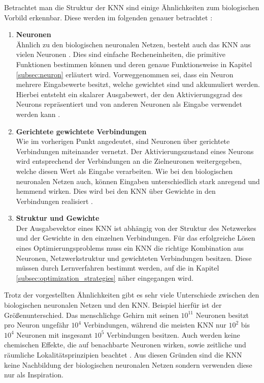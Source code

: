 Betrachtet man die Struktur der \ac{KNN} sind einige Ähnlichkeiten zum biologischen Vorbild erkennbar. Diese werden im folgenden genauer betrachtet \cite{zell2003simulation}:
\begin{enumerate}
	\item \textbf{Neuronen}\\
	Ähnlich zu den biologischen neuronalen Netzen, besteht auch das \ac{KNN} aus vielen Neuronen \cite{zell2003simulation}. Dies sind einfache Recheneinheiten, die primitive Funktionen bestimmen können \cite{scherer2013neuronale} und deren genaue Funktionsweise in Kapitel \ref{subsec:neuron} erläutert wird. Vorweggenommen sei, dass ein Neuron mehrere Eingabewerte besitzt, welche gewichtet sind und akkumuliert werden. Hierbei entsteht ein skalarer Ausgabewert, der den Aktivierungsgrad des Neurons repräsentiert und von anderen Neuronen als Eingabe verwendet werden kann \cite{kriesel2008kleiner}. 
	 
	\item \textbf{Gerichtete gewichtete Verbindungen}\\
	Wie im vorherigen Punkt angedeutet, sind Neuronen über gerichtete Verbindungen miteinander vernetzt. Der Aktivierungszustand eines Neurons wird entsprechend der Verbindungen an die Zielneuronen weitergegeben, welche diesen Wert als Eingabe verarbeiten. Wie bei den biologischen neuronalen Netzen auch, können Eingaben unterschiedlich stark anregend und hemmend wirken. Dies wird bei den \ac{KNN} über Gewichte in den Verbindungen realisiert \cite{zell2003simulation}.
	
	\item \textbf{Struktur und Gewichte}\\
	Der Ausgabevektor eines \ac{KNN} ist abhängig von der Struktur des Netzwerkes und der Gewichte in den einzelnen Verbindungen.
	Für das erfolgreiche Lösen eines Optimierungsproblems muss ein \ac{KNN} die richtige Kombination aus Neuronen, Netzwerkstruktur und gewichteten Verbindungen besitzen. Diese müssen durch Lernverfahren bestimmt werden, auf die in Kapitel \ref{subsec:optimization_strategies} näher eingegangen wird.
\end{enumerate}
Trotz der vorgestellten Ähnlichkeiten gibt es sehr viele Unterschiede zwischen den biologischen neuronalen Netzen und den \ac{KNN}. Beispiel hierfür ist der Größenunterschied. Das menschlichge Gehirn mit seinen ${10}^{11}$ Neuronen besitzt pro Neuron ungefähr $10^4$ Verbindungen, während die meisten \ac{KNN} nur ${10}^{2}$ bis ${10}^{4}$ Neuronen mit insgesamt ${10}^{5}$ Verbindungen besitzen. Auch werden keine chemischen Effekte, die auf benachbarte Neuronen wirken, sowie zeitliche und räumliche Lokalitätsprinzipien beachtet \cite{zell2003simulation}. Aus diesen Gründen sind die \ac{KNN} keine Nachbildung der biologischen neuronalen Netzen sondern verwenden diese nur als Inspiration. 

